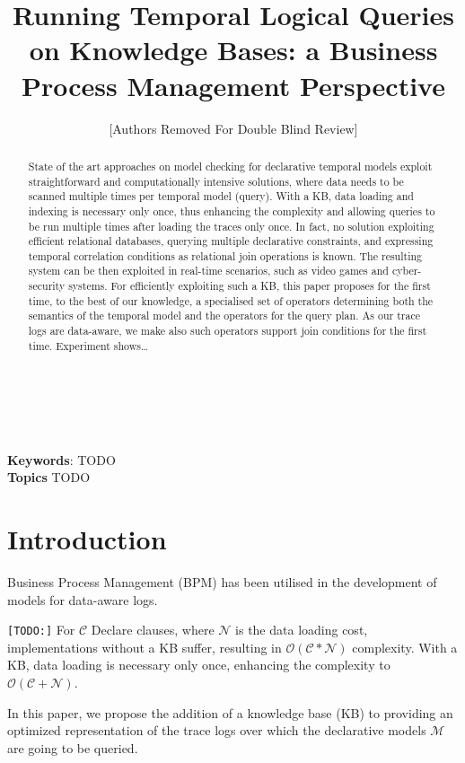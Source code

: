 \documentclass[11pt]{article}
\begin{document}
\title{Running Temporal Logical Queries on Knowledge Bases: a Business Process Management Perspective}

\author{[Authors Removed For Double Blind Review]}

\maketitle
~\\
\begin{abstract}
State of the art approaches on model checking for declarative temporal models exploit straightforward and computationally intensive solutions, where data needs to be scanned multiple times per temporal model (query). With a KB, data loading and indexing is necessary only once, thus enhancing the complexity and allowing queries to be run multiple times after loading the traces only once. In fact, no solution exploiting efficient relational databases, querying multiple declarative constraints, and expressing temporal correlation conditions as relational join operations is known. The resulting system can be then exploited in real-time scenarios, such as video games and cyber-security systems. For efficiently exploiting such a KB, this paper proposes for the first time, to the best of our knowledge, a specialised set of operators determining both the semantics of the temporal model and the operators for the query plan. As our trace logs are data-aware, we make also such operators support join conditions for the first time. Experiment shows\dots
\end{abstract}
~\\

{\bf Keywords}: TODO
~\\

{\bf Topics} TODO
~\\


\section{Introduction}
Business Process Management (BPM) has been utilised in the development of models for data-aware logs.

\texttt{\color{red}[TODO:]}  For $\mathcal{C}$ Declare clauses, where $\mathcal{N}$ is the data loading cost, implementations without a KB suffer, resulting in $\mathcal{O(C * N)}$ complexity. With a KB, data loading is necessary only once, enhancing the complexity to $\mathcal{O(C + N)}$.

 In this paper, we propose the addition of a knowledge base (KB) to providing an optimized representation of the trace logs over which the declarative models $\mathcal{M}$ are going to be queried. %
\end{document}
